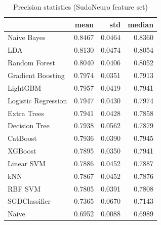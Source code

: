 \begin{table}
\caption{Precision statistics (SudoNeuro feature set)}
\label{tab:precision_SudoNeuro_stats}
\begin{tabular}{lrrr}
\toprule
 & mean & std & median \\
\midrule
Naive Bayes & 0.8467 & 0.0464 & 0.8360 \\
LDA & 0.8130 & 0.0474 & 0.8054 \\
Random Forest & 0.8040 & 0.0406 & 0.8052 \\
Gradient Boosting & 0.7974 & 0.0351 & 0.7913 \\
LightGBM & 0.7957 & 0.0419 & 0.7941 \\
Logistic Regression & 0.7947 & 0.0430 & 0.7974 \\
Extra Trees & 0.7941 & 0.0428 & 0.7858 \\
Decision Tree & 0.7938 & 0.0562 & 0.7879 \\
CatBoost & 0.7936 & 0.0390 & 0.7945 \\
XGBoost & 0.7895 & 0.0350 & 0.7941 \\
Linear SVM & 0.7886 & 0.0452 & 0.7887 \\
kNN & 0.7867 & 0.0452 & 0.7876 \\
RBF SVM & 0.7805 & 0.0391 & 0.7808 \\
SGDClassifier & 0.7365 & 0.0670 & 0.7143 \\
Naive & 0.6952 & 0.0088 & 0.6989 \\
\bottomrule
\end{tabular}
\end{table}
